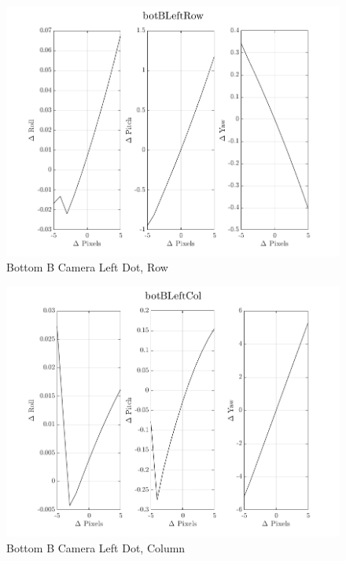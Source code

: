 \documentclass[12pt]{article}
\begin{document}
\begin{multicols}{2}
\begin{figure}[H]
	\includegraphics[width=0.9\columnwidth]{botBLeftRow.png}
	\caption{Bottom B Camera Left Dot, Row\label{fig:botBLeftRow}}
\end{figure}

\begin{figure}[H]
	\includegraphics[width=0.9\columnwidth]{botBLeftCol.png}
	\caption{Bottom B Camera Left Dot, Column\label{fig:botBLeftCol}}
\end{figure}


\end{multicols}
\end{document}
